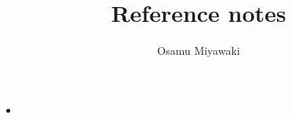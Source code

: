 \documentclass{article}
\title{Reference notes}
\author{Osamu Miyawaki}
\begin{document}
\maketitle

\begin{itemize}
\item \citep{feldl2020}
\end{itemize}



\end{document}
